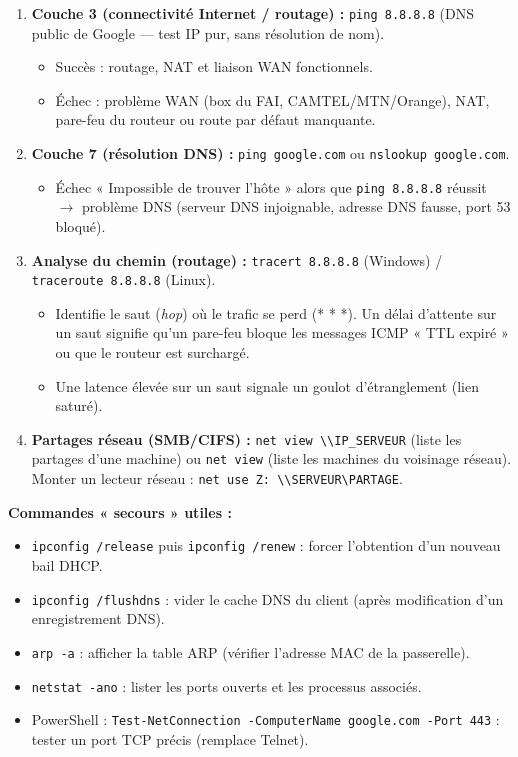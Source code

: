 \documentclass[11pt]{article}
\begin{document}
\begin{methode}
\begin{enumerate}
\begin{itemize}
        \end{itemize}
    \item \textbf{Couche 3 (connectivité Internet / routage) :} \texttt{ping 8.8.8.8} (DNS public de Google — test IP pur, sans résolution de nom).
        \begin{itemize}
            \item Succès : routage, NAT et liaison WAN fonctionnels.
            \item Échec : problème WAN (box du FAI, CAMTEL/MTN/Orange), NAT, pare-feu du routeur ou route par défaut manquante.
        \end{itemize}
    \item \textbf{Couche 7 (résolution DNS) :} \texttt{ping google.com} ou \texttt{nslookup google.com}.
        \begin{itemize}
            \item Échec « Impossible de trouver l'hôte » alors que \texttt{ping 8.8.8.8} réussit $\rightarrow$ problème DNS (serveur DNS injoignable, adresse DNS fausse, port 53 bloqué).
        \end{itemize}
    \item \textbf{Analyse du chemin (routage) :} \texttt{tracert 8.8.8.8} (Windows) / \texttt{traceroute 8.8.8.8} (Linux).
        \begin{itemize}
            \item Identifie le saut (\emph{hop}) où le trafic se perd (* * *). Un délai d'attente sur un saut signifie qu'un pare-feu bloque les messages ICMP « TTL expiré » ou que le routeur est surchargé.
            \item Une latence élevée sur un saut signale un goulot d'étranglement (lien saturé).
        \end{itemize}
    \item \textbf{Partages réseau (SMB/CIFS) :} \texttt{net view \textbackslash\textbackslash IP\_SERVEUR} (liste les partages d'une machine) ou \texttt{net view} (liste les machines du voisinage réseau). Monter un lecteur réseau : \texttt{net use Z: \textbackslash\textbackslash SERVEUR\textbackslash PARTAGE}.
\end{enumerate}
\textbf{Commandes « secours » utiles :}
\begin{itemize}
    \item \texttt{ipconfig /release} puis \texttt{ipconfig /renew} : forcer l'obtention d'un nouveau bail DHCP.
    \item \texttt{ipconfig /flushdns} : vider le cache DNS du client (après modification d'un enregistrement DNS).
    \item \texttt{arp -a} : afficher la table ARP (vérifier l'adresse MAC de la passerelle).
    \item \texttt{netstat -ano} : lister les ports ouverts et les processus associés.
    \item PowerShell : \texttt{Test-NetConnection -ComputerName google.com -Port 443} : tester un port TCP précis (remplace Telnet).
\end{itemize}
\end{methode}
\end{document}
